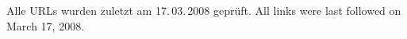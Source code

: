 \documentclass[
               a4paper,
               BCOR1.92mm,DIV11,headinclude, %
               bibliography=totoc,
               headsepline,
               cleardoublepage=empty,
               parskip=half,
               final   %
               ]{scrbook}
\let\ifdeutsch\iftrue
\begin{document}
\renewcommand*{\chapterpagestyle}{scrplain}
\pagestyle{scrheadings}







\ifdeutsch
\renewcommand{\appendixtocname}{Anhang}
\renewcommand{\appendixname}{Anhang}
\renewcommand{\appendixpagename}{Anhang}
\fi
\appendix


\printbibliography 
\ifdeutsch
Alle URLs wurden zuletzt am 17.\,03.\,2008 geprüft.
\else
All links were last followed on March 17, 2008.
\fi


\backmatter 
\pagestyle{empty}
\renewcommand*{\chapterpagestyle}{empty}

\end{document}
